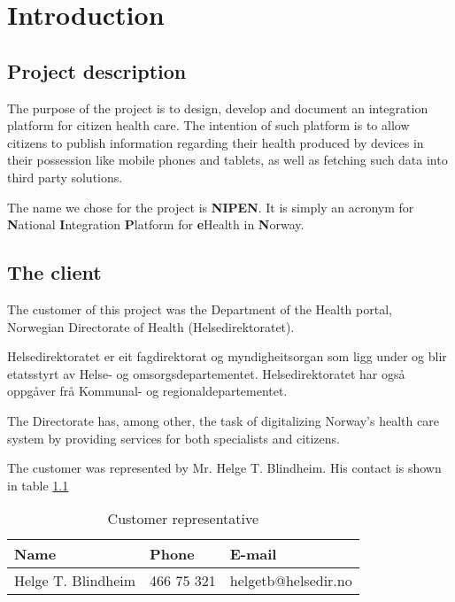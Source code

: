 
\chapter{Introduction} %

\label{Introduction} %



\section{Project description}

The purpose of the project is to design, develop and document an integration platform for citizen health care.
The intention of such platform is to allow citizens to publish information regarding their health produced by devices in their possession like mobile phones and tablets, as well as fetching such data into third party solutions.

The name we chose for the project is \textbf{NIPEN}. It is simply an acronym for \textbf{N}ational \textbf{I}ntegration \textbf{P}latform for \textbf{e}Health in \textbf{N}orway.



\section{The client}
The customer of this project was the Department of the Health portal, Norwegian Directorate of Health (Helsedirektoratet).

Helsedirektoratet er eit fagdirektorat og myndigheitsorgan som ligg under og blir etatsstyrt av Helse- og omsorgsdepartementet. Helsedirektoratet har også oppgåver frå Kommunal- og regionaldepartementet.

The Directorate has, among other, the task of digitalizing Norway's health care system by providing services for both specialists and citizens.

The customer was represented by Mr. Helge T. Blindheim. His contact is shown in table \ref{table:client}


\begin{table}
\begin{center}
\begin{tabular}{ l | l | l }
  \hline
  Name & Phone & E-mail \\
  \hline\noalign{\smallskip}\noalign{\smallskip}\hline
  Helge T. Blindheim	& 466 75 321 & helgetb@helsedir.no \\
  \hline
\end{tabular}
\end{center}
\caption{Customer representative}
\label{table:client}
\end{table}


